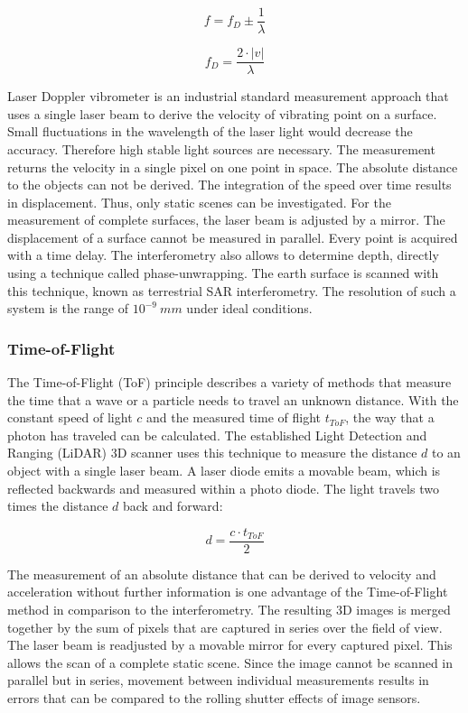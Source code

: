 \begin{equation}
f= f_D \pm \frac{1}{\lambda}
\end{equation}

\begin{equation}
f_D=\frac{2\cdot|v|}{\lambda}
\end{equation}
\medskip

Laser Doppler vibrometer is an industrial standard measurement approach that uses a single laser beam to derive the velocity of vibrating point on a surface. Small fluctuations in the wavelength of the laser light would decrease the accuracy. Therefore high stable light sources are necessary. The measurement returns the velocity in a single pixel on one point in space. The absolute distance to the objects can not be derived. The integration of the speed over time results in displacement. Thus, only static scenes can be investigated. For the measurement of complete surfaces, the laser beam is adjusted by a mirror. The displacement of a surface cannot be measured in parallel. Every point is acquired with a time delay. The interferometry also allows to determine depth, directly using a technique called phase-unwrapping.  The earth surface is scanned with this technique, known as terrestrial SAR interferometry. The resolution of such a system is the range of $10^{-9}~mm$ under ideal conditions.

\subsubsection{Time-of-Flight}
The Time-of-Flight (ToF) principle describes a variety of methods that measure the time that a wave or a particle needs to travel an unknown distance. With the constant speed of light $c$ and the measured time of flight $t_{ToF}$, the way that a photon has traveled can be calculated. The established Light Detection and Ranging (LiDAR) 3D scanner uses this technique to measure the distance $d$ to an object with a single laser beam. A laser diode emits a movable beam, which is reflected backwards and measured within a photo diode. The light travels two times the distance $d$ back and forward:

\begin{equation}
d=\frac{c\cdot t_{ToF}}{2} 
\end{equation}
\medskip

The measurement of an absolute distance that can be derived to velocity and acceleration without further information is one advantage of the Time-of-Flight method in comparison to the interferometry. The resulting 3D images is merged together by the sum of pixels that are captured in series over the field of view. The laser beam is readjusted by a movable mirror for every captured pixel. This allows the scan of a complete static scene. Since the image cannot be scanned in parallel but in series, movement between individual measurements results in errors that can be compared to the rolling shutter effects of image sensors. \\ 

